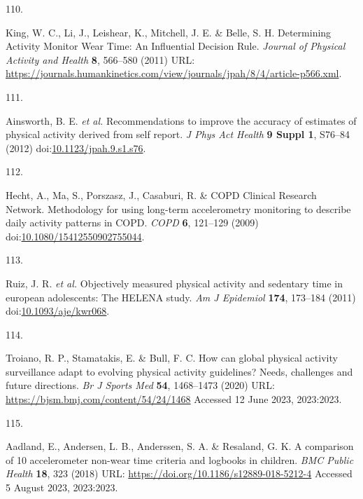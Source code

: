 \documentclass[
  10pt,
]{scrbook}
\newlength{\cslhangindent}
\newlength{\csllabelwidth}
\newlength{\cslentryspacingunit} %
\newenvironment{CSLReferences}[2] %
 {%
  \setlength{\parindent}{0pt}
  \ifodd #1
  \let\oldpar\par
  \def\par{\hangindent=\cslhangindent\oldpar}
  \fi
  \setlength{\parskip}{#2\cslentryspacingunit}
 }%
 {}
\newcommand{\CSLLeftMargin}[1]{\parbox[t]{\csllabelwidth}{#1}}
\newcommand{\CSLRightInline}[1]{\parbox[t]{\linewidth - \csllabelwidth}{#1}\break}
\let\originaltextbf\textbf
\renewcommand{\textbf}[1]{\textcolor{color1}{\originaltextbf{#1}}}
\begin{document}
\begin{CSLReferences}{0}{0}
\leavevmode{}%
\CSLLeftMargin{110. }%
\CSLRightInline{King, W. C., Li, J., Leishear, K., Mitchell, J. E. \&
Belle, S. H. Determining Activity Monitor Wear Time: An Influential
Decision Rule. \emph{Journal of Physical Activity and Health}
\textbf{8}, 566--580 (2011) URL:
\url{https://journals.humankinetics.com/view/journals/jpah/8/4/article-p566.xml}.}

\leavevmode{}%
\CSLLeftMargin{111. }%
\CSLRightInline{Ainsworth, B. E. \emph{et al.} Recommendations to
improve the accuracy of estimates of physical activity derived from self
report. \emph{J Phys Act Health} \textbf{9 Suppl 1}, S76--84 (2012)
doi:\href{https://doi.org/10.1123/jpah.9.s1.s76}{10.1123/jpah.9.s1.s76}.}

\leavevmode{}%
\CSLLeftMargin{112. }%
\CSLRightInline{Hecht, A., Ma, S., Porszasz, J., Casaburi, R. \& COPD
Clinical Research Network. Methodology for using long-term accelerometry
monitoring to describe daily activity patterns in {COPD}. \emph{{COPD}}
\textbf{6}, 121--129 (2009)
doi:\href{https://doi.org/10.1080/15412550902755044}{10.1080/15412550902755044}.}

\leavevmode{}%
\CSLLeftMargin{113. }%
\CSLRightInline{Ruiz, J. R. \emph{et al.} Objectively measured physical
activity and sedentary time in european adolescents: The {HELENA} study.
\emph{Am J Epidemiol} \textbf{174}, 173--184 (2011)
doi:\href{https://doi.org/10.1093/aje/kwr068}{10.1093/aje/kwr068}.}

\leavevmode{}%
\CSLLeftMargin{114. }%
\CSLRightInline{Troiano, R. P., Stamatakis, E. \& Bull, F. C. How can
global physical activity surveillance adapt to evolving physical
activity guidelines? Needs, challenges and future directions. \emph{Br J
Sports Med} \textbf{54}, 1468--1473 (2020) URL:
\url{https://bjsm.bmj.com/content/54/24/1468} Accessed 12 June 2023,
2023:2023.}

\leavevmode{}%
\CSLLeftMargin{115. }%
\CSLRightInline{Aadland, E., Andersen, L. B., Anderssen, S. A. \&
Resaland, G. K. A comparison of 10 accelerometer non-wear time criteria
and logbooks in children. \emph{{BMC} Public Health} \textbf{18}, 323
(2018) URL: \url{https://doi.org/10.1186/s12889-018-5212-4} Accessed 5
August 2023, 2023:2023.}


\end{CSLReferences}
\end{document}
